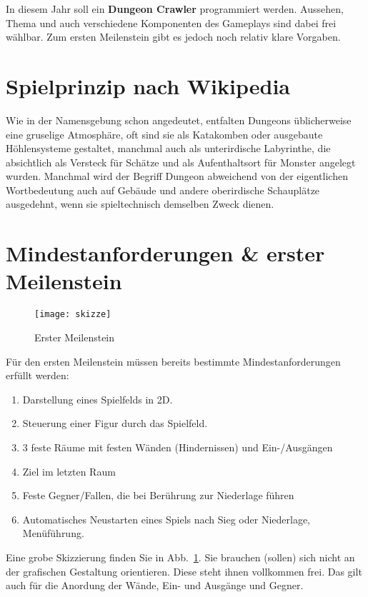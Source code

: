 \documentclass{programmierpraktikum}
\subtitle{Dungeon Crawler}
\begin{document}
%
\maketitle
In diesem Jahr soll ein \textbf{Dungeon Crawler} programmiert werden. Aussehen, Thema und auch
verschiedene Komponenten des Gameplays sind dabei frei wählbar. Zum ersten Meilenstein gibt es
jedoch noch relativ klare Vorgaben.
%
\section{Spielprinzip nach Wikipedia}
Wie in der Namensgebung schon angedeutet, entfalten Dungeons üblicherweise eine gruselige
Atmosphäre, oft sind sie als Katakomben oder ausgebaute Höhlensysteme gestaltet, manchmal auch
als unterirdische Labyrinthe, die absichtlich als Versteck für Schätze und als Aufenthaltsort
für Monster angelegt wurden. Manchmal wird der Begriff Dungeon abweichend von der eigentlichen
Wortbedeutung auch auf Gebäude und andere oberirdische Schauplätze ausgedehnt, wenn sie spieltechnisch
demselben Zweck dienen.
%
\section{Mindestanforderungen \& erster Meilenstein}
%
\begin{figure}[h!]
  \begin{center}
    \texttt{[image: skizze]}
    \caption{Erster Meilenstein\label{fig:skizze}}
  \end{center}
\end{figure}
Für den ersten Meilenstein müssen bereits bestimmte Mindestanforderungen erfüllt werden:
\begin{enumerate}
  \item Darstellung eines Spielfelds in 2D.
  \item Steuerung einer Figur durch das Spielfeld.
  \item 3 feste Räume mit festen Wänden (Hindernissen) und Ein-/Ausgängen
  \item Ziel im letzten Raum
  \item Feste Gegner/Fallen, die bei Berührung zur Niederlage führen
  \item Automatisches Neustarten eines Spiels nach Sieg oder Niederlage, Menüführung.
\end{enumerate}
Eine grobe Skizzierung finden Sie in Abb.~\ref{fig:skizze}. Sie brauchen (sollen) sich nicht an der
grafischen Gestaltung orientieren. Diese steht ihnen vollkommen frei. Das gilt auch für die
Anordung der Wände, Ein- und Ausgänge und Gegner.
\end{document}
